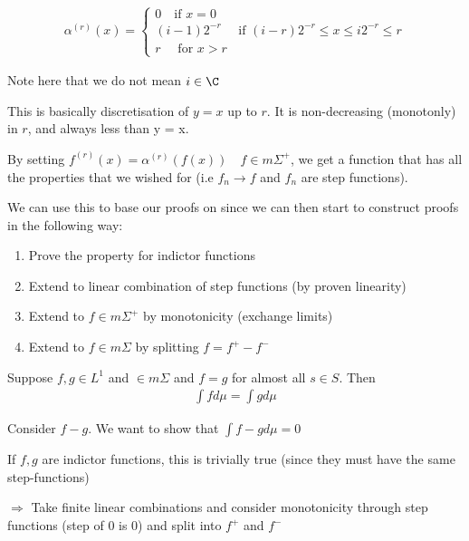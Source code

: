 \begin{equation*}
  \begin{gathered}
    \alpha^{(r)}(x) = \begin{cases}0\quad\text{if } x=0\\(i-1)2^{-r}\quad\text{ if } (i-r)2^{-r}\leq x\leq i2^{-r}\leq r\\r\quad\text{ for } x>r\end{cases}
  \end{gathered}
\end{equation*}\par
\noindent Note here that we do not mean $i\in\C$\par
\noindent This is basically discretisation of $y = x$ up to $r$. It is non-decreasing (monotonly) in $r$, and always less than y = x. \par
\noindent By setting $f^{(r)}(x) = \alpha^{(r)}(f(x))\quad f\in m\Sigma^+$, we get a function that has all the properties that we wished for (i.e $f_n\to f$ and $f_n$ are step functions).\par
\noindent We can use this to base our proofs on since we can then start to construct proofs in the following way:\par
\begin{enumerate}[leftmargin=*]
  \item Prove the property for indictor functions
  \item Extend to linear combination of step functions (by proven linearity)
  \item Extend to $f\in m\Sigma^+$ by monotonicity (exchange limits)
  \item Extend to $f\in m\Sigma$ by splitting $f = f^+-f^-$
\end{enumerate}
\par\bigskip
\begin{lem}[]{}
  Suppose $f,g\in L^1$ and $\in m\Sigma$ and $f=g$ for almost all $s\in S$. Then
  \begin{equation*}
    \begin{gathered}
      \int f d\mu = \int g d\mu
    \end{gathered}
  \end{equation*}
\end{lem}
\par\bigskip
\begin{prf}[(Sketch)]{}
  Consider $f-g$. We want to show that $\int f-g d\mu = 0$\par
  \noindent If $f,g$ are indictor functions, this is trivially true (since they must have the same step-functions)\par
  \noindent$\Rightarrow$ Take finite linear combinations and consider monotonicity through step functions (step of 0 is 0) and split into $f^+$ and $f^-$
\end{prf}
